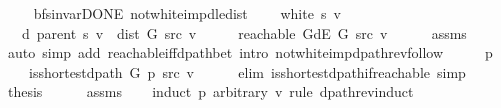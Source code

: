 \begin{isabellebody}
\ \ \isamarkupfalse%
\isanewline
{}\isamarkupfalse%
%
\endisatagproof
{\isafoldproof}%
%
\isadelimproof
\isanewline
%
\endisadelimproof
\isanewline
{}\isamarkupfalse%
\ {\isacharparenleft}{\kern0pt}\ bfs{\isacharunderscore}{\kern0pt}invar{\isacharunderscore}{\kern0pt}DONE{\isacharparenright}{\kern0pt}\ not{\isacharunderscore}{\kern0pt}white{\isacharunderscore}{\kern0pt}imp{\isacharunderscore}{\kern0pt}d{\isacharunderscore}{\kern0pt}le{\isacharunderscore}{\kern0pt}dist{\isacharcolon}{\kern0pt}\isanewline
\ \ \ {\isachardoublequoteopen}{\isasymnot}\ white\ s\ v{\isachardoublequoteclose}\isanewline
\ \ \ {\isachardoublequoteopen}d\ {\isacharparenleft}{\kern0pt}parent\ s{\isacharparenright}{\kern0pt}\ v\ {\isasymle}\ dist\ G\ src\ v{\isachardoublequoteclose}\isanewline
%
\isadelimproof
%
\endisadelimproof
%
\isatagproof
{}\isamarkupfalse%
\ {\isacharminus}{\kern0pt}\isanewline
\ \ \isamarkupfalse%
\ {\isachardoublequoteopen}reachable\ {\isacharparenleft}{\kern0pt}G{\isachardot}{\kern0pt}dE\ G{\isacharparenright}{\kern0pt}\ src\ v{\isachardoublequoteclose}\isanewline
\ \ \ \ \isamarkupfalse%
\ assms\isanewline
\ \ \ \ \isamarkupfalse%
\ {\isacharparenleft}{\kern0pt}auto\ simp\ add{\isacharcolon}{\kern0pt}\ reachable{\isacharunderscore}{\kern0pt}iff{\isacharunderscore}{\kern0pt}dpath{\isacharunderscore}{\kern0pt}bet\ intro{\isacharcolon}{\kern0pt}\ not{\isacharunderscore}{\kern0pt}white{\isacharunderscore}{\kern0pt}imp{\isacharunderscore}{\kern0pt}dpath{\isacharunderscore}{\kern0pt}rev{\isacharunderscore}{\kern0pt}follow{\isacharparenright}{\kern0pt}\isanewline
\ \ \isamarkupfalse%
\ \isamarkupfalse%
\ p\ \isanewline
\ \ \ \ {\isachardoublequoteopen}is{\isacharunderscore}{\kern0pt}shortest{\isacharunderscore}{\kern0pt}dpath\ G\ p\ src\ v{\isachardoublequoteclose}\isanewline
\ \ \ \ \isamarkupfalse%
\ {\isacharparenleft}{\kern0pt}elim\ is{\isacharunderscore}{\kern0pt}shortest{\isacharunderscore}{\kern0pt}dpath{\isacharunderscore}{\kern0pt}if{\isacharunderscore}{\kern0pt}reachable{\isacharunderscore}{\kern0pt}{}{\isacharparenright}{\kern0pt}\ simp{\isacharplus}{\kern0pt}\isanewline
\ \ \isamarkupfalse%
\ {\isacharquery}{\kern0pt}thesis\isanewline
\ \ \ \ \isamarkupfalse%
\ assms\isanewline
\ \ \isamarkupfalse%
\ {\isacharparenleft}{\kern0pt}induct\ p\ arbitrary{\isacharcolon}{\kern0pt}\ v\ rule{\isacharcolon}{\kern0pt}\ dpath{\isacharunderscore}{\kern0pt}rev{\isacharunderscore}{\kern0pt}induct{\isacharparenright}{\kern0pt}\isanewline

\end{isabellebody}
